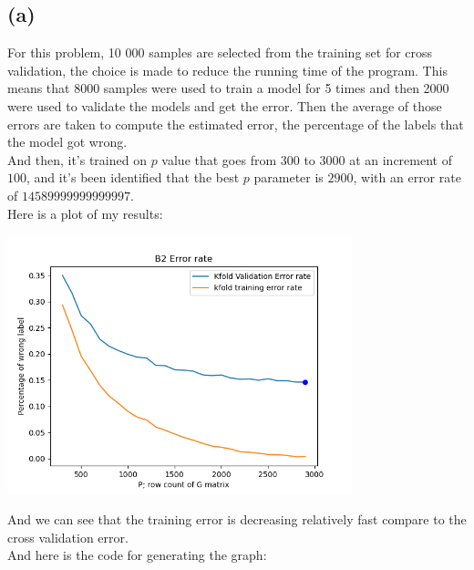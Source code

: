 \documentclass[]{article}
\begin{document}
		\subsection*{(a)}
			For this problem, 10 000 samples are selected from the training set for cross validation, the choice is made to reduce the running time of the program. This means that 8000 samples were used to train a model for 5 times and then 2000 were used to validate the models and get the error. Then the average of those errors are taken to compute the estimated error, the percentage of the labels that the model got wrong. 
			\\
			And then, it's trained on $p$ value that goes from $300$ to $3000$ at an increment of $100$, and it's been identified that the best $p$ parameter is $2900$, with an error rate of $14589999999999997$. 
			\\
			Here is a plot of my results: 
			\begin{center}\includegraphics[width=10cm]{B2plot.png}\end{center}
			And we can see that the training error is decreasing relatively fast compare to the cross validation error. 
			\\
			And here is the code for generating the graph: 
\end{document}
